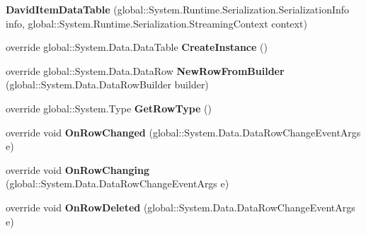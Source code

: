 \begin{DoxyCompactItemize}
\item 
{\bfseries David\+Item\+Data\+Table} (global\+::\+System.\+Runtime.\+Serialization.\+Serialization\+Info info, global\+::\+System.\+Runtime.\+Serialization.\+Streaming\+Context context)\hypertarget{class_products_1_1_data_1_1ds_sage_1_1_david_item_data_table_a1878685b3800b8d6318373eac88b376b}{}\label{class_products_1_1_data_1_1ds_sage_1_1_david_item_data_table_a1878685b3800b8d6318373eac88b376b}

\item 
override global\+::\+System.\+Data.\+Data\+Table {\bfseries Create\+Instance} ()\hypertarget{class_products_1_1_data_1_1ds_sage_1_1_david_item_data_table_a2ed3307fae783ae0364b5ef96b067f87}{}\label{class_products_1_1_data_1_1ds_sage_1_1_david_item_data_table_a2ed3307fae783ae0364b5ef96b067f87}

\item 
override global\+::\+System.\+Data.\+Data\+Row {\bfseries New\+Row\+From\+Builder} (global\+::\+System.\+Data.\+Data\+Row\+Builder builder)\hypertarget{class_products_1_1_data_1_1ds_sage_1_1_david_item_data_table_a44234867394150f6b2ecd8d424a20fd3}{}\label{class_products_1_1_data_1_1ds_sage_1_1_david_item_data_table_a44234867394150f6b2ecd8d424a20fd3}

\item 
override global\+::\+System.\+Type {\bfseries Get\+Row\+Type} ()\hypertarget{class_products_1_1_data_1_1ds_sage_1_1_david_item_data_table_ae345008df539d4f8cc084676f9c08892}{}\label{class_products_1_1_data_1_1ds_sage_1_1_david_item_data_table_ae345008df539d4f8cc084676f9c08892}

\item 
override void {\bfseries On\+Row\+Changed} (global\+::\+System.\+Data.\+Data\+Row\+Change\+Event\+Args e)\hypertarget{class_products_1_1_data_1_1ds_sage_1_1_david_item_data_table_add83895935365379bb9f2196ca4ce62b}{}\label{class_products_1_1_data_1_1ds_sage_1_1_david_item_data_table_add83895935365379bb9f2196ca4ce62b}

\item 
override void {\bfseries On\+Row\+Changing} (global\+::\+System.\+Data.\+Data\+Row\+Change\+Event\+Args e)\hypertarget{class_products_1_1_data_1_1ds_sage_1_1_david_item_data_table_ae2e5284400c06925aaa0637746376830}{}\label{class_products_1_1_data_1_1ds_sage_1_1_david_item_data_table_ae2e5284400c06925aaa0637746376830}

\item 
override void {\bfseries On\+Row\+Deleted} (global\+::\+System.\+Data.\+Data\+Row\+Change\+Event\+Args e)\hypertarget{class_products_1_1_data_1_1ds_sage_1_1_david_item_data_table_a522b6f5d76a0dc45b3fa7721b5e92c15}{}\label{class_products_1_1_data_1_1ds_sage_1_1_david_item_data_table_a522b6f5d76a0dc45b3fa7721b5e92c15}


\end{DoxyCompactItemize}
